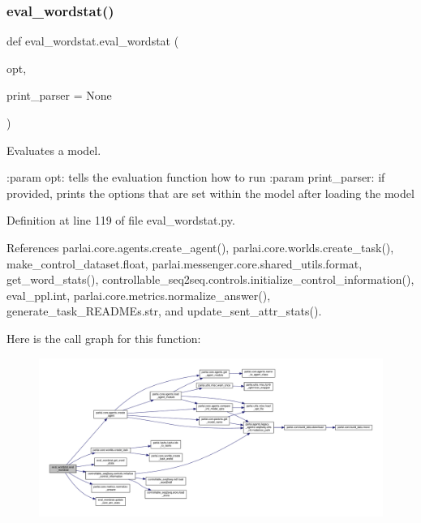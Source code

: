 \subsubsection{\texorpdfstring{eval\+\_\+wordstat()}{eval\_wordstat()}}
{\footnotesize\ttfamily def eval\+\_\+wordstat.\+eval\+\_\+wordstat (\begin{DoxyParamCaption}\item[{}]{opt,  }\item[{}]{print\+\_\+parser = {\ttfamily None} }\end{DoxyParamCaption})}

\begin{DoxyVerb}Evaluates a model.

:param opt: tells the evaluation function how to run
:param print_parser: if provided, prints the options that are set within the
    model after loading the model
\end{DoxyVerb}
 

Definition at line 119 of file eval\+\_\+wordstat.\+py.



References parlai.\+core.\+agents.\+create\+\_\+agent(), parlai.\+core.\+worlds.\+create\+\_\+task(), make\+\_\+control\+\_\+dataset.\+float, parlai.\+messenger.\+core.\+shared\+\_\+utils.\+format, get\+\_\+word\+\_\+stats(), controllable\+\_\+seq2seq.\+controls.\+initialize\+\_\+control\+\_\+information(), eval\+\_\+ppl.\+int, parlai.\+core.\+metrics.\+normalize\+\_\+answer(), generate\+\_\+task\+\_\+\+R\+E\+A\+D\+M\+Es.\+str, and update\+\_\+sent\+\_\+attr\+\_\+stats().

Here is the call graph for this function\+:
\nopagebreak
\begin{figure}[H]
\begin{center}
\leavevmode
\includegraphics[width=350pt]{namespaceeval__wordstat_aeb6ae646e7e2bede292baff78ca1bd83_cgraph}
\end{center}
\end{figure}
\mbox{\label{namespaceeval__wordstat_a2290cb39c5797675ac4020f96447c1ff}} 
